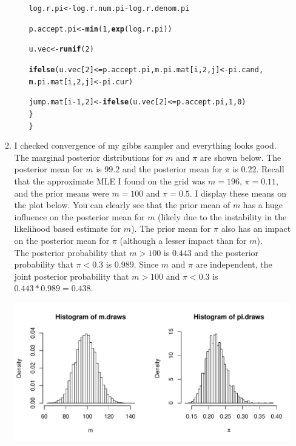 \documentclass[12pt]{article}\usepackage[]{graphicx}\usepackage[]{color}
\makeatletter
\newcommand{\hlnum}[1]{\textcolor[rgb]{0.686,0.059,0.569}{#1}}%
\newcommand{\hlopt}[1]{\textcolor[rgb]{0,0,0}{#1}}%
\newcommand{\hlstd}[1]{\textcolor[rgb]{0.345,0.345,0.345}{#1}}%
\newcommand{\hlkwb}[1]{\textcolor[rgb]{0.69,0.353,0.396}{#1}}%
\newcommand{\hlkwd}[1]{\textcolor[rgb]{0.737,0.353,0.396}{\textbf{#1}}}%
\newenvironment{kframe}{%
 \def\at@end@of@kframe{}%
 \ifinner\ifhmode%
  \def\at@end@of@kframe{\end{minipage}}%
  \begin{minipage}{\columnwidth}%
 \fi\fi%
 \def\FrameCommand##1{\hskip\@totalleftmargin \hskip-\fboxsep
 \colorbox{shadecolor}{##1}\hskip-\fboxsep
     \hskip-\linewidth \hskip-\@totalleftmargin \hskip\columnwidth}%
 \MakeFramed {\advance\hsize-\width
   \@totalleftmargin\z@ \linewidth\hsize
   \@setminipage}}%
 {\par\unskip\endMakeFramed%
 \at@end@of@kframe}
\newenvironment{knitrout}{}{} %
\makeatother
\begin{document}
\begin{enumerate}
\begin{enumerate}
\begin{enumerate}
\begin{knitrout}
\begin{kframe}
\begin{alltt}
    \hlstd{log.r.pi} \hlkwb{<-} \hlstd{log.r.num.pi} \hlopt{-} \hlstd{log.r.denom.pi}

    \hlstd{p.accept.pi} \hlkwb{<-} \hlkwd{min}\hlstd{(}\hlnum{1}\hlstd{,} \hlkwd{exp}\hlstd{(log.r.pi))}

    \hlstd{u.vec} \hlkwb{<-} \hlkwd{runif}\hlstd{(}\hlnum{2}\hlstd{)}

    \hlkwd{ifelse}\hlstd{(u.vec[}\hlnum{2}\hlstd{]} \hlopt{<=} \hlstd{p.accept.pi, m.pi.mat[i,} \hlnum{2}\hlstd{, j]} \hlkwb{<-} \hlstd{pi.cand,}
           \hlstd{m.pi.mat[i,} \hlnum{2}\hlstd{, j]} \hlkwb{<-} \hlstd{pi.cur)}

    \hlstd{jump.mat[i}\hlopt{-}\hlnum{1}\hlstd{,} \hlnum{2}\hlstd{]} \hlkwb{<-} \hlkwd{ifelse}\hlstd{(u.vec[}\hlnum{2}\hlstd{]} \hlopt{<=} \hlstd{p.accept.pi,} \hlnum{1}\hlstd{,} \hlnum{0}\hlstd{)}
  \hlstd{\}}
\hlstd{\}}
\end{alltt}
\end{kframe}
\end{knitrout}



\end{enumerate}

\item I checked convergence of my gibbs sampler and everything looks good. The marginal posterior distributions for $m$ and $\pi$ are shown below. The posterior mean for $m$ is $99.2$ and the posterior mean for $\pi$ is $0.22$. Recall that the approximate MLE I found on the grid was $m=196$, $\pi = 0.11$, and the prior means were $m = 100$ and $\pi = 0.5$. I display these means on the plot below. You can clearly see that the prior mean of $m$ has a huge influence on the posterior mean for $m$ (likely due to the instability in the likelihood based estimate for $m$). The prior mean for $\pi$ also has an impact on the posterior mean for $\pi$ (although a lesser impact than for $m$). \\

The posterior probability that $m>100$ is $0.443$ and the posterior probability that $\pi < 0.3$ is $0.989$. Since $m$ and $\pi$ are independent, the joint posterior probability that $m > 100$ and $\pi < 0.3$ is $0.443*0.989 = 0.438$.

\begin{knitrout}\footnotesize
{}\color{fgcolor}
\includegraphics[width=\linewidth]{figure/converdiags-1} 


\end{knitrout}
\end{enumerate}
\end{enumerate}
\end{document}
